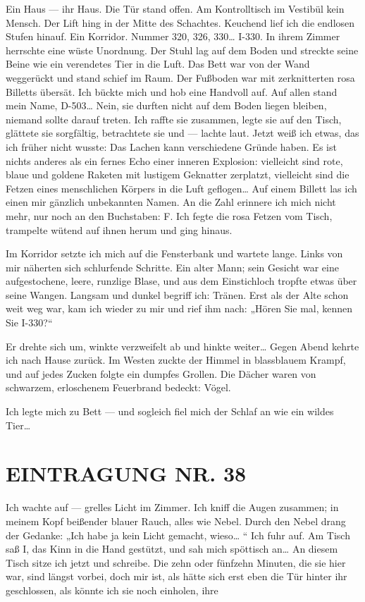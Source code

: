Ein Haus — ihr Haus. Die Tür stand offen. Am Kontrolltisch im
Vestibül kein Mensch. Der Lift hing in der Mitte des Schachtes.
Keuchend lief ich die endlosen Stufen hinauf. Ein Korridor. Nummer
320, 326, 330\ldots{} I-330. In ihrem Zimmer herrschte eine wüste
Unordnung. Der Stuhl lag auf dem Boden und streckte seine Beine wie
ein verendetes Tier in die Luft. Das Bett war von der Wand
weggerückt und stand schief im Raum. Der Fußboden war mit
zerknitterten rosa Billetts übersät. Ich bückte mich und hob eine
Handvoll auf. Auf allen stand mein Name, D-503\ldots{} Nein, sie durften
nicht auf dem Boden liegen bleiben, niemand sollte darauf treten.
Ich raffte sie zusammen, legte sie auf den Tisch, glättete sie
sorgfältig, betrachtete sie und — lachte laut. Jetzt weiß ich
etwas, das ich früher nicht wusste: Das Lachen kann verschiedene
Gründe haben. Es ist nichts anderes als ein fernes Echo einer
inneren Explosion: vielleicht sind rote, blaue und goldene Raketen
mit lustigem Geknatter zerplatzt, vielleicht sind die Fetzen eines
menschlichen Körpers in die Luft geflogen\ldots{} Auf einem Billett las
ich einen mir gänzlich unbekannten Namen. An die Zahl erinnere ich
mich nicht mehr, nur noch an den Buchstaben: F. Ich fegte die rosa
Fetzen vom Tisch, trampelte wütend auf ihnen herum und ging
hinaus.

Im Korridor setzte ich mich auf die Fensterbank und wartete lange.
Links von mir näherten sich schlurfende Schritte. Ein alter Mann;
sein Gesicht war eine aufgestochene, leere, runzlige Blase, und aus
dem Einstichloch tropfte etwas über seine Wangen. Langsam und
dunkel begriff ich: Tränen. Erst als der Alte schon weit weg war,
kam ich wieder zu mir und rief ihm nach: „Hören Sie mal, kennen Sie
I-330?“

Er drehte sich um, winkte verzweifelt ab und hinkte weiter\ldots{} Gegen
Abend kehrte ich nach Hause zurück. Im Westen zuckte der Himmel in
blassblauem Krampf, und auf jedes Zucken folgte ein dumpfes
Grollen. Die Dächer waren von schwarzem, erloschenem Feuerbrand
bedeckt: Vögel.

Ich legte mich zu Bett — und sogleich fiel mich der Schlaf an wie
ein wildes Tier\ldots{}

\section{EINTRAGUNG NR. 38}

Ich wachte auf — grelles Licht im Zimmer. Ich kniff die Augen
zusammen; in meinem Kopf beißender blauer Rauch, alles wie Nebel.
Durch den Nebel drang der Gedanke: „Ich habe ja kein Licht gemacht,
wieso\ldots{} “ Ich fuhr auf. Am Tisch saß I, das Kinn in die Hand
gestützt, und sah mich spöttisch an\ldots{} An diesem Tisch sitze ich
jetzt und schreibe. Die zehn oder fünfzehn Minuten, die sie hier
war, sind längst vorbei, doch mir ist, als hätte sich erst eben die
Tür hinter ihr geschlossen, als könnte ich sie noch einholen, ihre

